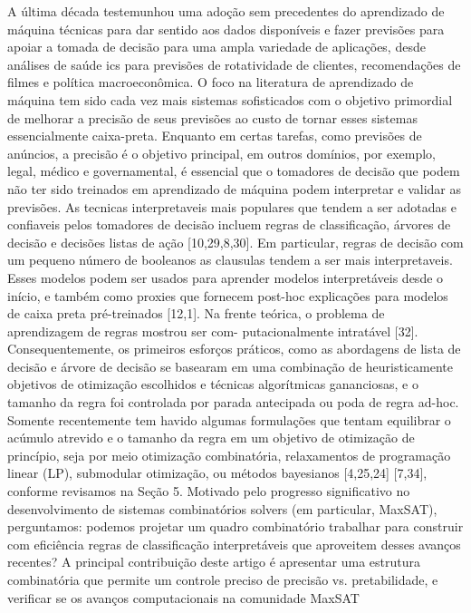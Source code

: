\documentclass[a4paper, 12 pt]{article}
\begin{document}
A última década testemunhou uma adoção sem precedentes do aprendizado de máquina
técnicas para dar sentido aos dados disponíveis e fazer previsões para apoiar a
tomada de decisão para uma ampla variedade de aplicações, desde análises de saúde
ics para previsões de rotatividade de clientes, recomendações de filmes e política macroeconômica. O foco na literatura de aprendizado de máquina tem sido cada vez mais
sistemas sofisticados com o objetivo primordial de melhorar a precisão de seus
previsões ao custo de tornar esses sistemas essencialmente caixa-preta. Enquanto em
certas tarefas, como previsões de anúncios, a precisão é o objetivo principal, em outros
domínios, por exemplo, legal, médico e governamental, é essencial que o
tomadores de decisão que podem não ter sido treinados em aprendizado de máquina podem interpretar
e validar as previsões.
As tecnicas interpretaveis ​​mais populares que tendem a ser adotadas e
confiaveis ​​pelos tomadores de decisão incluem regras de classificação, árvores de decisão e decisões
listas de ação [10,29,8,30]. Em particular, regras de decisão com um pequeno número de booleanos
as clausulas tendem a ser mais interpretaveis. Esses modelos podem ser usados ​​para aprender
modelos interpretáveis ​​desde o início, e também como proxies que fornecem post-hoc
explicações para modelos de caixa preta pré-treinados [12,1].
Na frente teórica, o problema de aprendizagem de regras mostrou ser com-
putacionalmente intratável [32]. Consequentemente, os primeiros esforços práticos, como
as abordagens de lista de decisão e árvore de decisão se basearam em uma combinação de heuristicamente
objetivos de otimização escolhidos e técnicas algorítmicas gananciosas, e o tamanho
da regra foi controlada por parada antecipada ou poda de regra ad-hoc. Somente
recentemente tem havido algumas formulações que tentam equilibrar o acúmulo
atrevido e o tamanho da regra em um objetivo de otimização de princípio, seja por meio
otimização combinatória, relaxamentos de programação linear (LP), submodular
otimização, ou métodos bayesianos [4,25,24] [7,34], conforme revisamos na Seção 5.
Motivado pelo progresso significativo no desenvolvimento de sistemas combinatórios
solvers (em particular, MaxSAT), perguntamos: podemos projetar um quadro combinatório
trabalhar para construir com eficiência regras de classificação interpretáveis ​​que aproveitem
desses avanços recentes? A principal contribuição deste artigo é apresentar
uma estrutura combinatória que permite um controle preciso de precisão vs.
pretabilidade, e verificar se os avanços computacionais na comunidade MaxSAT
\end{document}
